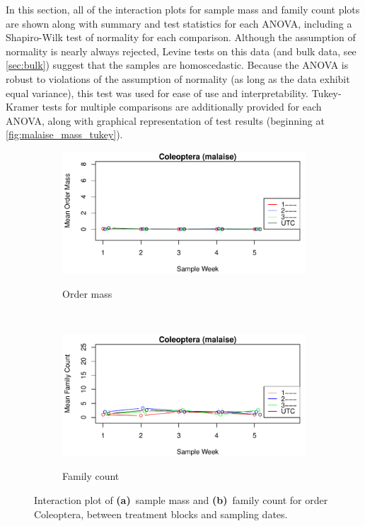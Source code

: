 \documentclass[10pt,letterpaper,twocolumn]{article}
\begin{document}
In this section, all of the interaction plots for sample mass and family count plots are shown along with summary and test statistics for each ANOVA, including a Shapiro-Wilk test of normality for each comparison.
Although the assumption of normality is nearly always rejected, Levine tests on this data (and bulk data, see \cref{sec:bulk}) suggest that the samples are homoscedastic.
Because the ANOVA is robust to violations of the assumption of normality (as long as the data exhibit equal variance), this test was used for ease of use and interpretability.
Tukey-Kramer tests for multiple comparisons are additionally provided for each ANOVA, along with graphical representation of test results (beginning at \cref{fig:malaise_mass_tukey}).

\begin{figure}[h]
	\centering
	\begin{subfigure}[b]{0.45\textwidth}
		\caption{Order mass}
		\includegraphics[width=\textwidth]{plots/blocks/interaction/mass/mass_malaise_Coleoptera_interplot.pdf}
		\label{fig:malaise_coleoptera_mass_interplot}
	\end{subfigure}
	~
	\begin{subfigure}[b]{0.45\textwidth}
		\caption{Family count}
		\includegraphics[width=\textwidth]{plots/blocks/interaction/family/family_malaise_Coleoptera_interplot.pdf}
		\label{fig:malaise_coleoptera_family_interplot}
	\end{subfigure}
	\caption{Interaction plot of \textbf{(a)}~sample mass and \textbf{(b)}~family count for order Coleoptera, between treatment blocks and sampling dates.}
	\label{fig:malaise_coleoptera_interplot}
	\smallskip
	\nointerlineskip
	\hrulefill
\end{figure}
\end{document}
